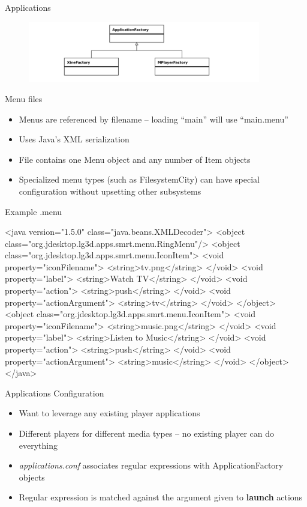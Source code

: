 \documentclass[style=smrt,mode=present,paper=screen]{powerdot}
\begin{document}
\begin{slide}{Applications}
\begin{figure}[htb]
	\includegraphics[angle=-90,width=4in]{../lib/figures/ApplicationFactory-uml}
\end{figure}
\end{slide}

\begin{slide}{Menu files}
\begin{itemize}
        \item Menus are referenced by filename -- loading ``main'' will use ``main.menu''
	\item Uses Java's XML serialization
	\item File contains one Menu object and any number of Item objects
	\item Specialized menu types (such as FilesystemCity) can have special
	      configuration without upsetting other subsystems
\end{itemize}
\end{slide}

\begin{slide}[method=direct]{Example .menu}
\begin{code}
<java version="1.5.0" class="java.beans.XMLDecoder">
  <object class="org.jdesktop.lg3d.apps.smrt.menu.RingMenu"/>
  <object class="org.jdesktop.lg3d.apps.smrt.menu.IconItem">
    <void property="iconFilename">   <string>tv.png</string>   </void>
    <void property="label">          <string>Watch TV</string> </void>
    <void property="action">         <string>push</string>     </void>
    <void property="actionArgument"> <string>tv</string>       </void>
  </object>
  <object class="org.jdesktop.lg3d.apps.smrt.menu.IconItem">
    <void property="iconFilename">   <string>music.png</string> </void>
    <void property="label">
        <string>Listen to Music</string>
    </void>
    <void property="action">         <string>push</string>      </void>
    <void property="actionArgument"> <string>music</string>     </void>
  </object>
</java>
\end{code}
\end{slide}


\begin{slide}{Applications Configuration}
\begin{itemize}
        \item Want to leverage any existing player applications
	\item Different players for different media types -- no existing player can do everything
	\item \textit{applications.conf} associates regular expressions with ApplicationFactory objects
	\item Regular expression is matched against the argument given to \textbf{launch} actions
\end{itemize}
\end{slide}
\end{document}
